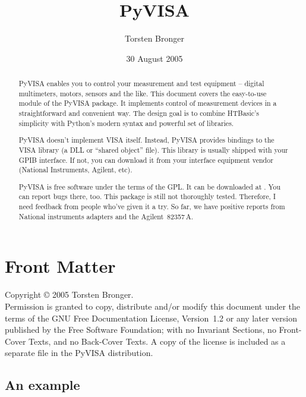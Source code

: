 \documentclass{howto}
\title{PyVISA}
\author{Torsten Bronger}
\date{30 August 2005}
\begin{document}
\maketitle

\ifhtml
\chapter*{Front Matter\label{front}}
\fi

Copyright \copyright{} 2005 Torsten Bronger.\\
Permission is granted to copy, distribute and/or modify this document under the
terms of the GNU Free Documentation License, Version~1.2 or any later version
published by the Free Software Foundation; with no Invariant Sections, no
Front-Cover Texts, and no Back-Cover Texts.  A copy of the license is included
as a separate file  in the PyVISA distribution.

\begin{abstract}

\noindent
PyVISA enables you to control your measurement and test equipment -- digital
multimeters, motors, sensors and the like.  This document covers the
easy-to-use  module of the PyVISA package.  It implements control
of measurement devices in a straightforward and convenient way.  The design
goal is to combine HTBasic's simplicity with Python's modern syntax and
powerful set of libraries.

PyVISA doesn't implement VISA itself.  Instead, PyVISA provides bindings to the
VISA library (a DLL or ``shared object'' file).  This library is usually
shipped with your GPIB interface.  If not, you can download it from your
interface equipment vendor (National Instruments, Agilent, etc).

PyVISA is free software under the terms of the GPL\@.  It can be downloaded at
.  You can
report bugs there, too.  This package is still not thoroughly tested.
Therefore, I need feedback from people who've given it a try.  So far, we have
positive reports from National instruments adapters and the Agilent~82357\,A\@.
\end{abstract}

\begin{samepage}
  \tableofcontents
\end{samepage}


\section{An example}
\end{document}
